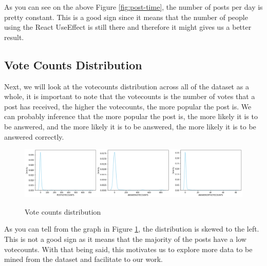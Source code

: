 As you can see on the above Figure \ref{fig:post-time}, the number of posts per day is pretty constant. This is a good sign since it means that the number of people using the React UseEffect is still there and therefore it might gives us a better result.

\subsection{Vote Counts Distribution} \label{vote-counts}
Next, we will look at the votecounts distribution across all of the dataset as a whole, it is important to note that the votecounts is the number of votes that a post has received, the higher the votecounts, the more popular the post is. We can probably inference that the more popular the post is, the more likely it is to be answered, and the more likely it is to be answered, the more likely it is to be answered correctly.

\begin{figure}[H]
  \centering
  \noindent \includegraphics[scale=0.35]{votecounts-distri.png}\\   
\caption{Vote counts distribution}\label{fig:vote-counts}
\end{figure}


As you can tell from the graph in Figure \ref{fig:vote-counts}, the distribution is skewed to the left. This is not a good sign as it means that the majority of the posts have a low votecounts. With that being said, this motivates us to explore more data to be mined from the dataset and facilitate to our work.





